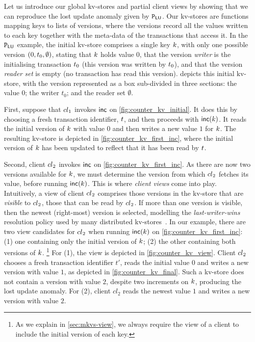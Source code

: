 Let us introduce  our global kv-stores and partial client views by
showing that we can reproduce the lost update anomaly given by 
\(\mathtt{P}_{\mathsf{LU}}\).
Our kv-stores are functions mapping keys to lists of versions, where
the versions  record all the values written to each key together with the
meta-data of the transactions that access it. 
In the \(\mathtt{P}_{\mathsf{LU}}\) example, the initial kv-store comprises a single key \(k\), with only one possible 
version \((0, t_{0}, \emptyset)\),  stating that \(k\) holds value \(0\), 
that the version \emph{writer} is the initialising transaction
\(t_0\) (this version was written by \(t_0\)), 
and that the version \emph{reader set} is empty (no transaction has read this version). 
 depicts this initial kv-store, with the version
represented as a box sub-divided in three sections: the value \(0\);
the writer \(t_0\); and the reader set \(\emptyset\). 







First, suppose that \({cl}_1\)  invokes \(\mathsf{inc}\) on
\cref{fig:counter_kv_initial}. It does this by choosing a fresh
transaction identifier, \(t\), 
and then proceeds with \(\mathsf{inc}(k)\). It reads the initial version
of \(k\) with value \(0\) 
and then writes a new value \(1\) for \(k\). 
The resulting kv-store is depicted in \cref{fig:counter_kv_first_inc},
where  the initial version of \(k\)  has been  updated to reflect that it
has been read by \(t\). 

Second, client \({cl}_2\) invokes \(\mathsf{inc}\) on
\cref{fig:counter_kv_first_inc}.  As there are now two versions
available for \(k\), we must determine the version from which
\({cl}_2\) fetches its value, before running \(\mathsf{inc}(k)\).  This is
where \emph{client views} come into play.  Intuitively, a view of
client \({cl}_2\) comprises those versions in the kv-store that are
\emph{visible} to \({cl}_2\), \ie those that can be read by
\({cl}_2\).  If more than one version is visible, then the newest
(right-most) version is selected, modelling the \emph{last-writer-wins}
resolution policy used by many distributed
kv-stores~\cite{vogels:2009:ec:1435417.1435432}.  In our example,
there are two view candidates for \({cl}_2\) when running
\(\mathsf{inc}(k)\) on \cref{fig:counter_kv_first_inc}: (1) one containing
only the initial version of \(k\); (2) the other containing both
versions of \(k\).%
\footnote{ As we explain in \cref{sec:mkvs-view}, we always require
  the view of a client to include the initial version of each key.}  
For (1), the view is depicted in
\cref{fig:counter_kv_view}.  Client \({cl}_2\) chooses a fresh
transaction identifier \(t'\), reads the initial value \(0\) and writes a
new version with value \(1\), as depicted in
\cref{fig:counter_kv_final}.  Such a kv-store does not contain a
version with value \(2\), despite two increments on \(k\), producing
the lost update anomaly.  For (2), client \(cl_2\) reads the newest
value \(1\) and writes a new version with value \(2\).

